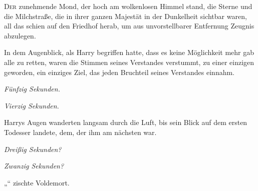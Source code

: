 
\lettrine{D}{er} zunehmende Mond, der hoch am wolkenlosen Himmel stand, die Sterne und die Milchstraße, die in ihrer ganzen Majestät in der Dunkelheit sichtbar waren, all das schien auf den Friedhof herab, um aus unvorstellbarer Entfernung Zeugnis abzulegen.

In dem Augenblick, als Harry begriffen hatte, dass es keine Möglichkeit mehr gab alle zu retten, waren die Stimmen seines Verstandes verstummt, zu einer einzigen geworden, ein einziges Ziel, das jeden Bruchteil seines Verstandes einnahm.

\emph{Fünfzig Sekunden.}

\emph{Vierzig Sekunden.}

Harrys Augen wanderten langsam durch die Luft, bis sein Blick auf dem ersten Todesser landete, dem, der ihm am nächsten war.

\emph{Dreißig Sekunden?}

\emph{Zwanzig Sekunden?}

„“ zischte Voldemort.

